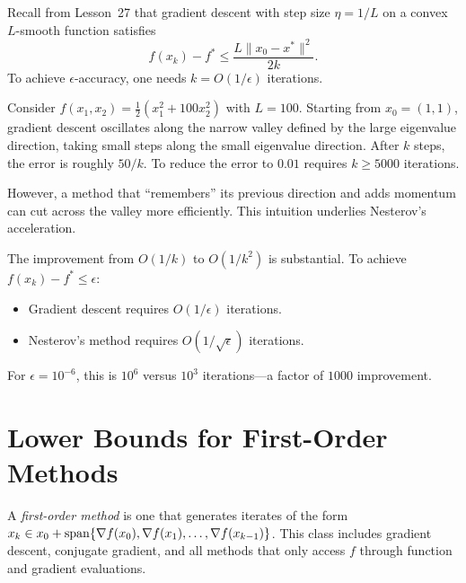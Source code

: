 \documentclass[11pt,a4paper]{article}
\begin{document}
Recall from Lesson~27 that gradient descent with step size $\eta = 1/L$
on a convex $L$-smooth function satisfies
\begin{equation}\label{eq:gd-rate}
  f(x_k) - f^* \le \frac{L \|x_0 - x^*\|^2}{2k}.
\end{equation}
To achieve $\epsilon$-accuracy, one needs $k = O(1/\epsilon)$ iterations.

\begin{example}%
\label{ex:ill-conditioned}
Consider $f(x_1, x_2) = \frac{1}{2}(x_1^2 + 100 x_2^2)$ with
$L = 100$. Starting from $x_0 = (1, 1)$, gradient descent oscillates
along the narrow valley defined by the large eigenvalue direction,
taking small steps along the small eigenvalue direction. After $k$
steps, the error is roughly $50/k$. To reduce the error to $0.01$
requires $k \ge 5000$ iterations.

However, a method that ``remembers'' its previous direction and adds
momentum can cut across the valley more efficiently. This intuition
underlies Nesterov's acceleration.
\end{example}

\begin{remark}\label{rem:gap}
The improvement from $O(1/k)$ to $O(1/k^2)$ is substantial.
To achieve $f(x_k) - f^* \le \epsilon$:
\begin{itemize}
  \item Gradient descent requires $O(1/\epsilon)$ iterations.
  \item Nesterov's method requires $O(1/\sqrt{\epsilon})$ iterations.
\end{itemize}
For $\epsilon = 10^{-6}$, this is $10^6$ versus $10^3$ iterations---a
factor of $1000$ improvement.
\end{remark}


\section{Lower Bounds for First-Order Methods}\label{sec:lower-bounds}

A \emph{first-order method} is one that generates iterates of the form
$x_k \in x_0 + \operatorname{span}\{\nabla f(x_0), \nabla f(x_1), \dots,
\nabla f(x_{k-1})\}$. This class includes gradient descent, conjugate
gradient, and all methods that only access $f$ through function and
gradient evaluations.
\end{document}
